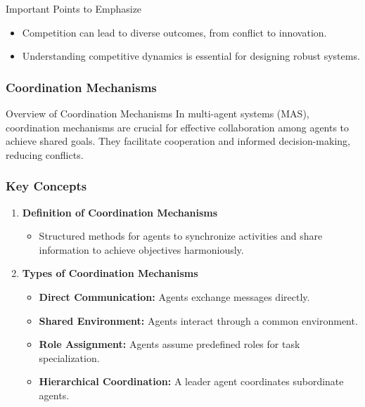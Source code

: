 \documentclass[aspectratio=169]{beamer}
\begin{document}
\begin{frame}[fragile]
    \begin{block}{Important Points to Emphasize}
        \begin{itemize}
            \item Competition can lead to diverse outcomes, from conflict to innovation.
            \item Understanding competitive dynamics is essential for designing robust systems.
        \end{itemize}
    \end{block}
\end{frame}

\begin{frame}[fragile]
    \frametitle{Coordination Mechanisms}
    \begin{block}{Overview of Coordination Mechanisms}
        In multi-agent systems (MAS), coordination mechanisms are crucial for effective collaboration among agents to achieve shared goals. They facilitate cooperation and informed decision-making, reducing conflicts.
    \end{block}
\end{frame}

\begin{frame}[fragile]
    \frametitle{Key Concepts}
    \begin{enumerate}
        \item \textbf{Definition of Coordination Mechanisms}
        \begin{itemize}
            \item Structured methods for agents to synchronize activities and share information to achieve objectives harmoniously.
        \end{itemize}
        
        \item \textbf{Types of Coordination Mechanisms}
        \begin{itemize}
            \item \textbf{Direct Communication:} Agents exchange messages directly.
            \item \textbf{Shared Environment:} Agents interact through a common environment.
            \item \textbf{Role Assignment:} Agents assume predefined roles for task specialization.
            \item \textbf{Hierarchical Coordination:} A leader agent coordinates subordinate agents.
        \end{itemize}
    \end{enumerate}
\end{frame}
\end{document}
